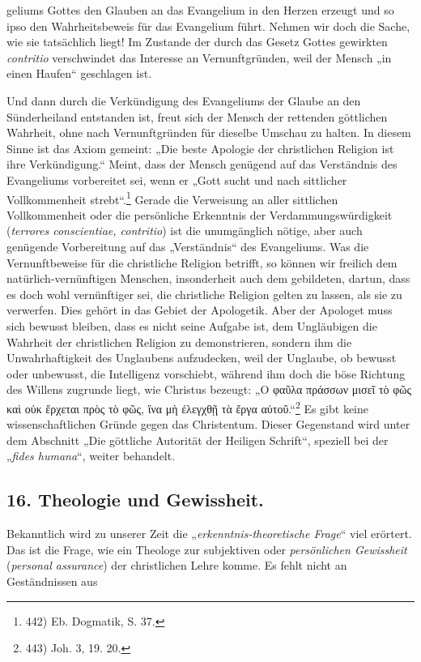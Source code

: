geliums Gottes den Glauben an das Evangelium in den Herzen erzeugt und so ipso den Wahrheitsbeweis für das Evangelium führt. Nehmen wir doch die Sache, wie sie tatsächlich liegt! Im Zustande der durch das Gesetz Gottes gewirkten \emph{contritio} verschwindet das Interesse an Vernunftgründen, weil der Mensch „in einen Haufen“ geschlagen ist.\par Und dann durch die Verkündigung des Evangeliums der Glaube an den Sünderheiland entstanden ist, freut sich der Mensch der rettenden göttlichen Wahrheit, ohne nach Vernunftgründen für dieselbe Umschau zu halten. In diesem Sinne ist das Axiom gemeint: „Die beste Apologie der christlichen Religion ist ihre Verkündigung.“ Meint, dass der Mensch genügend auf das Verständnis des Evangeliums vorbereitet sei, wenn er „Gott sucht und nach sittlicher Vollkommenheit strebt“.\footnote{442) Eb. Dogmatik, S. 37.} Gerade die Verweisung an aller sittlichen Vollkommenheit oder die persönliche Erkenntnis der Verdammungswürdigkeit (\emph{terrores conscientiae, contritio}) ist die unumgänglich nötige, aber auch genügende Vorbereitung auf das „Verständnis“ des Evangeliums. Was die Vernunftbeweise für die christliche Religion betrifft, so können wir freilich dem natürlich-vernünftigen Menschen, insonderheit auch dem gebildeten, dartun, dass es doch wohl vernünftiger sei, die christliche Religion gelten zu lassen, als sie zu verwerfen. Dies gehört in das Gebiet der Apologetik. Aber der Apologet muss sich bewusst bleiben, dass es nicht seine Aufgabe ist, dem Ungläubigen die Wahrheit der christlichen Religion zu demonstrieren, sondern ihm die Unwahrhaftigkeit des Unglaubens aufzudecken, weil der Unglaube, ob bewusst oder unbewusst, die Intelligenz vorschiebt, während ihm doch die böse Richtung des Willens zugrunde liegt, wie Christus bezeugt: „Ο φαῦλα πράσσων μισεῖ τὸ φῶς καὶ οὐκ ἔρχεται πρὸς τὸ φῶς, ἵνα μὴ ἐλεγχθῇ τὰ ἔργα αὐτοῦ.“\footnote{443) Joh. 3, 19. 20.} Es gibt keine wissenschaftlichen Gründe gegen das Christentum. Dieser Gegenstand wird unter dem Abschnitt „Die göttliche Autorität der Heiligen Schrift“, speziell bei der „\emph{fides humana}“, weiter behandelt.\par\subsection*{16. Theologie und Gewissheit.}\par Bekanntlich wird zu unserer Zeit die „\emph{erkenntnis-theoretische Frage}“ viel erörtert. Das ist die Frage, wie ein Theologe zur subjektiven oder \emph{persönlichen Gewissheit} (\emph{personal assurance}) der christlichen Lehre komme. Es fehlt nicht an Geständnissen aus